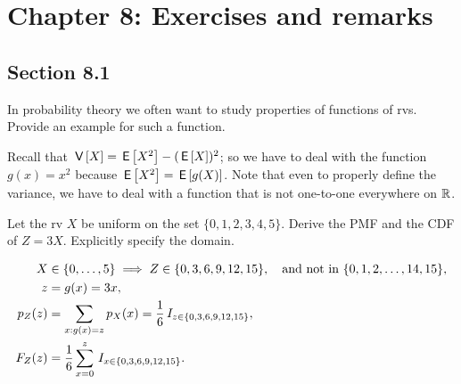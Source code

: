 

\chapter{Chapter 8: Exercises and remarks}

\section{Section 8.1}


\begin{exercise}
In probability theory we often want to study properties of  functions of rvs. Provide an example for such  a function.
\begin{solution}
Recall that $\,\mathsf{V}\left[X\right] = \,\mathsf{E}\left[X^2\right]-(\,\mathsf{E}\left[X\right])^2$; so we have to deal with the function $g(x) = x^{2}$ because $\,\mathsf{E}\left[X^2\right]= \,\mathsf{E}\left[g(X)\right]$.
Note that even to properly define the variance, we have to deal with a function that is not one-to-one everywhere on $\mathbb{R}$.
\end{solution}
\end{exercise}


\begin{exercise}
Let the rv $X$ be uniform on the set $\{0, 1, 2, 3, 4, 5\}$. Derive the PMF and the CDF of $Z=3X$. Explicitly specify the domain.
\begin{solution}
  \begin{align}
    \label{eq:17}
    X &\in \{0, \ldots, 5\} \implies Z \in \{0, 3, 6, 9, 12, 15\}, \quad \text{and not in } \{0, 1, 2, \ldots, 14, 15\},\\
z &= g(x) = 3x,\\
p_{Z}(z) &= \sum_{x: g(x) =z } p_{X}(x) = \frac{1}{6} \,I_{z \in \{0, 3, 6, 9, 12, 15\}}, \\
F_{Z}(z) &=\frac{1}{6} \sum_{x=0}^{z} \,I_{x \in \{0, 3, 6, 9, 12, 15\}}.
  \end{align}
\end{solution}
\end{exercise}



